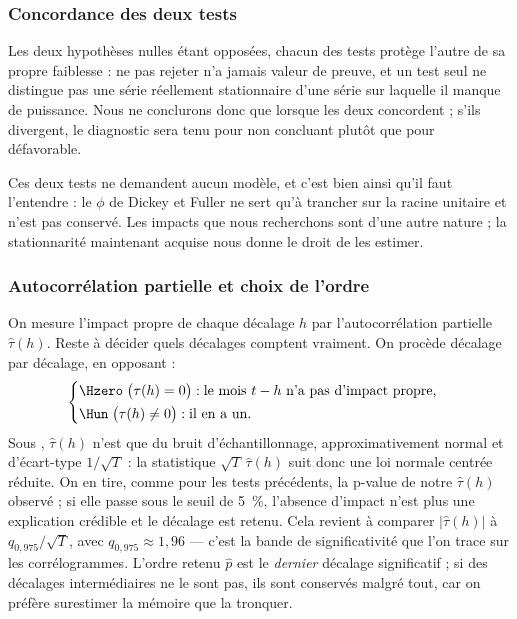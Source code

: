 \subsubsection*{Concordance des deux tests}

Les deux hypothèses nulles étant opposées, chacun des tests protège l'autre de
sa propre faiblesse : ne pas rejeter n'a jamais valeur de preuve, et un test
seul ne distingue pas une série réellement stationnaire d'une série sur
laquelle il manque de puissance. Nous ne conclurons donc que lorsque les deux
concordent ; s'ils divergent, le diagnostic sera tenu pour non concluant
plutôt que pour défavorable.

Ces deux tests ne demandent aucun modèle, et c'est bien ainsi qu'il faut
l'entendre : le \(\phi\) de Dickey et Fuller ne sert qu'à trancher sur la
racine unitaire et n'est pas conservé. Les impacts que nous recherchons sont
d'une autre nature ; la stationnarité maintenant acquise nous donne le droit
de les estimer.

\subsubsection*{Autocorrélation partielle et choix de l'ordre}

On mesure l'impact propre de chaque décalage \(h\) par l'autocorrélation
partielle \(\hat\tau(h)\). Reste à décider quels décalages comptent vraiment.
On procède décalage par décalage, en opposant :
\[
  \begin{cases}
    \Hzero \;\bigl(\tau(h) = 0\bigr) : \text{le mois } t-h \text{ n'a pas d'impact propre,}\\[2pt]
    \Hun \;\bigl(\tau(h) \neq 0\bigr) : \text{il en a un.}
  \end{cases}
\]
Sous \Hzero{}, \(\hat\tau(h)\) n'est que du bruit d'échantillonnage,
approximativement normal et d'écart-type \(1/\sqrt{T}\) : la statistique
\(\sqrt{T}\,\hat\tau(h)\) suit donc une loi normale centrée réduite. On en
tire, comme pour les tests précédents, la p-value de notre \(\hat\tau(h)\)
observé ; si elle passe sous le seuil de 5~\%, l'absence d'impact n'est plus
une explication crédible et le décalage est retenu. Cela revient à comparer
\(\bigl|\hat\tau(h)\bigr|\) à \(q_{0{,}975}/\sqrt{T}\), avec
\(q_{0{,}975} \approx 1{,}96\) — c'est la bande de significativité que l'on
trace sur les corrélogrammes.
L'ordre retenu \(\hat p\) est le \emph{dernier} décalage significatif ; si
des décalages intermédiaires ne le sont pas, ils sont conservés
malgré tout, car on préfère surestimer la mémoire que la tronquer.

